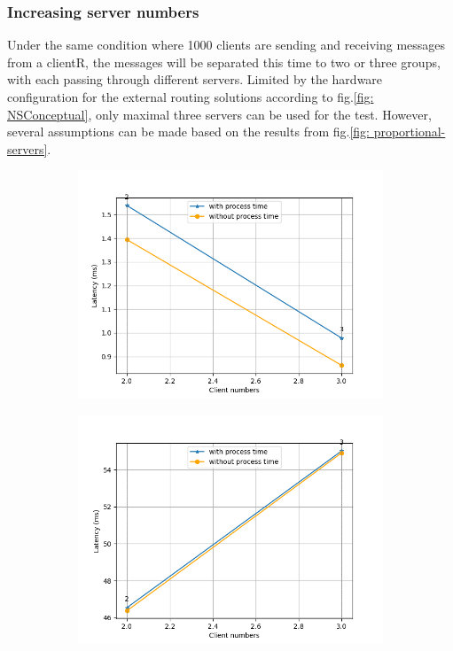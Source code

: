 \subsubsection{Increasing server numbers}
Under the same condition where 1000 clients are sending and receiving messages from 
a clientR, the messages will be separated this time to two or three groups, with 
each passing through different servers. Limited by the hardware configuration 
for the external routing solutions according to fig.\ref{fig: NSConceptual}, only 
maximal three servers can be used for the test. However, several assumptions 
can be made based on the results from fig.\ref{fig: proportional-servers}. 


\begin{figure}[htb]
    \begin{subfigure}[b]{0.49\textwidth}
        \centering
        \includegraphics[width=\textwidth]{figures/tests/proportional_tests/Average_string_messages_sending_time_of_100_tests_diff_server_numbers.png}\hfill 
        \caption{} \label{fig: proportional-servers-a}
    \end{subfigure}
    \begin{subfigure}[b]{0.49\textwidth}
        \centering
        \includegraphics[width=\textwidth]{figures/tests/proportional_tests/Average_string_messages_receiving_time_of_100_tests_diff_server_numbers.png}\hfill 

\end{subfigure}
\end{figure}

